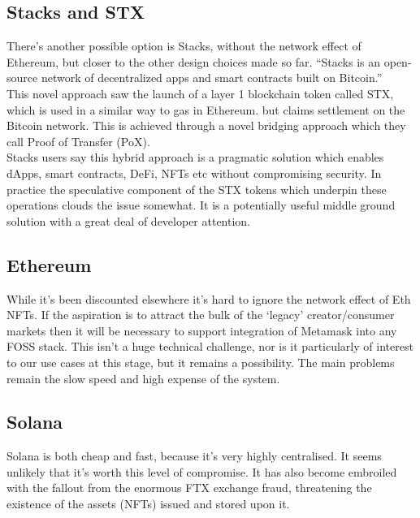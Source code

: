 \subsection{Stacks and STX}
There's another possible option is Stacks, without the network effect of Ethereum, but closer to the other design choices made so far. ``Stacks is an open-source network of decentralized apps and smart contracts built on Bitcoin.''\\ 
This novel approach saw the launch of a layer 1 blockchain token called STX, which is used in a similar way to gas in Ethereum. but claims settlement on the Bitcoin network. This is achieved through a novel bridging approach which they call Proof of Transfer (PoX).\\
Stacks users say this hybrid approach is a pragmatic solution which enables dApps, smart contracts, DeFi, NFTs etc without compromising security. In practice the speculative component of the STX tokens which underpin these operations clouds the issue somewhat. It is a potentially useful middle ground solution with a great deal of developer attention.
\subsection{Ethereum}
While it's been discounted elsewhere it's hard to ignore the network effect of Eth NFTs. If the aspiration is to attract the bulk of the `legacy' creator/consumer markets then it will be necessary to support integration of Metamask into any FOSS stack. This isn't a huge technical challenge, nor is it particularly of interest to our use cases at this stage, but it remains a possibility. The main problems remain the slow speed and high expense of the system.
\subsection{Solana}
Solana is both cheap and fast, because it's very highly centralised. It seems unlikely that it's worth this level of compromise. It has also become embroiled with the fallout from the enormous FTX exchange fraud, threatening the existence of the assets (NFTs) issued and stored upon it.
